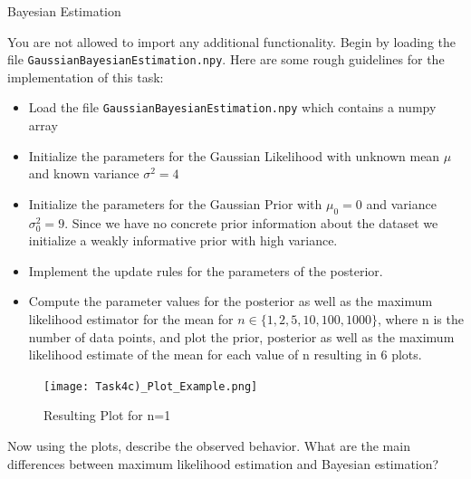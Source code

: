 \documentclass[
	english,
        solution=true
	]{tudaexercise}
\begin{document}
\begin{task}[points=16]{Bayesian Estimation}
\begin{subtask}[points=12]
    You are not allowed to import any additional functionality. Begin by loading the file \texttt{GaussianBayesianEstimation.npy}. Here are some rough guidelines for the implementation of this task:
    \begin{itemize}
        \item Load the file \texttt{GaussianBayesianEstimation.npy} which contains a numpy array 
        \item Initialize the parameters for the Gaussian Likelihood with unknown mean $\mu$ and known variance $\sigma^{2}=4$  
        \item Initialize the parameters for the Gaussian Prior with $\mu_{0}=0$ and variance $\sigma_{0}^2=9$. Since we have no concrete prior information about the dataset we initialize a weakly informative prior with high variance.
        \item Implement the update rules for the parameters of the posterior.
        \item Compute the parameter values for the posterior as well as the maximum likelihood estimator for the mean for $n \in \{1, 2, 5, 10, 100, 1000\}$, where n is the number of data points, and plot the prior, posterior as well as the maximum likelihood estimate of the mean for each value of n resulting in 6 plots.
    \end{itemize}



\begin{figure}[h]
    \centering
    \texttt{[image: Task4c)\_Plot\_Example.png]}
    \caption{Resulting Plot for n=1}
    \label{fig:task4c-plot-n1}
\end{figure}
    Now using the plots, describe the observed behavior. What are the main differences between maximum likelihood estimation and Bayesian estimation?
\end{subtask}

\begin{solution}

\end{solution}
\end{task}

\newpage
\end{document}
